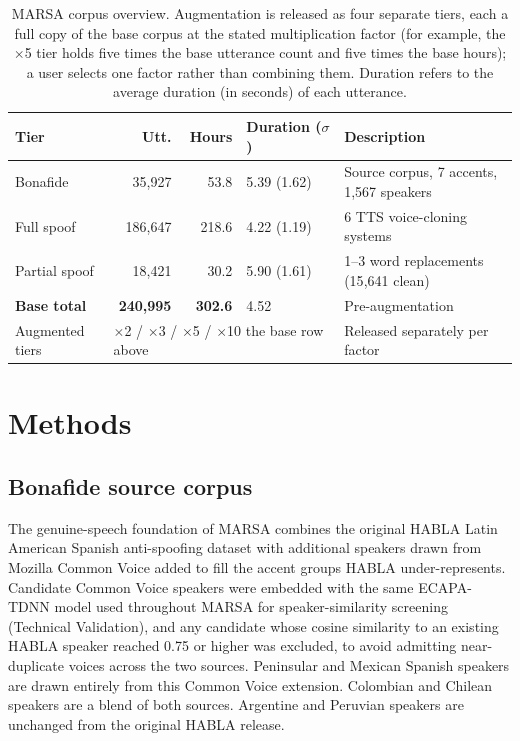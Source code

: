 \documentclass[11pt]{article}
\begin{document}
\begin{table}[H]
\centering
\caption{MARSA corpus overview. Augmentation is released as four
separate tiers, each a full copy of the base corpus at the stated
multiplication factor (for example, the $\times$5 tier holds five times
the base utterance count and five times the base hours); a user selects
one factor rather than combining them. Duration refers to the average duration (in seconds) of each utterance.}
\label{tab:overview}
\small
\begin{tabular}{lrrlp{5.5cm}}
\toprule
\textbf{Tier} & \textbf{Utt.} & \textbf{Hours} & \textbf{Duration ($\sigma$)}  & \textbf{Description} \\
\midrule
Bonafide            & 35{,}927  & 53.8  & 5.39 (1.62)  & Source corpus, 7 accents, 1{,}567 speakers \\
Full spoof          & 186{,}647 & 218.6 & 4.22 (1.19)  & 6 TTS voice-cloning systems \\
Partial spoof       & 18{,}421  & 30.2  & 5.90 (1.61)  & 1--3 word replacements (15{,}641 clean) \\
\midrule
\textbf{Base total} & \textbf{240{,}995} & \textbf{302.6} & 4.52 &  Pre-augmentation \\
\midrule
Augmented tiers & \multicolumn{3}{l}{$\times$2 / $\times$3 / $\times$5 / $\times$10 the base row above} & Released separately per factor \\
\bottomrule
\end{tabular}
\end{table}

\FloatBarrier
\section*{Methods}

\FloatBarrier
\subsection*{Bonafide source corpus}

The genuine-speech foundation of MARSA combines the original HABLA
Latin American Spanish anti-spoofing dataset \citep{habla} with
additional speakers drawn from Mozilla Common Voice \citep{commonvoice} added to fill the accent groups HABLA under-represents. Candidate
Common Voice speakers were embedded with the same ECAPA-TDNN model used
throughout MARSA for speaker-similarity screening \citep{ecapa}
(Technical Validation), and any candidate whose cosine similarity to an
existing HABLA speaker reached 0.75 or higher was excluded, to avoid
admitting near-duplicate voices across the two sources.
Peninsular and Mexican Spanish speakers are drawn entirely from this Common Voice extension. Colombian and Chilean speakers are a blend of both sources.
Argentine and Peruvian speakers are unchanged from the original HABLA
release.
\end{document}
